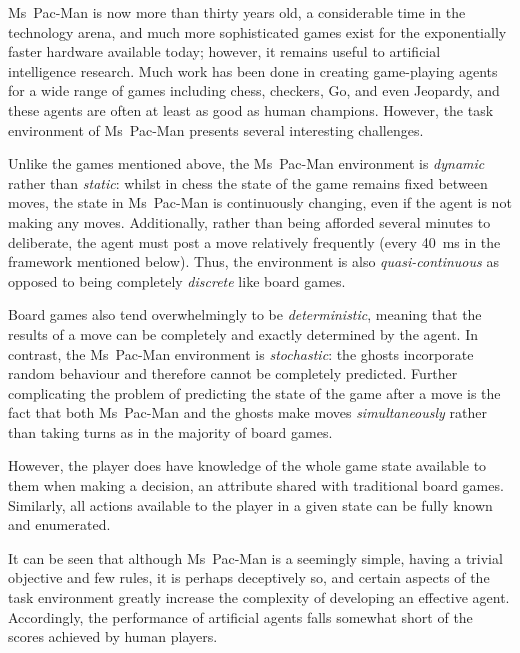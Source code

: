 Ms~Pac-Man is now more than thirty years old, a considerable time in the technology arena, and much more sophisticated games exist for the exponentially faster hardware available today; however, it remains useful to artificial intelligence research.  Much work has been done in creating game-playing agents for a wide range of games including chess, checkers, Go, and even Jeopardy, and these agents are often at least as good as human champions.  However, the task environment  of Ms~Pac-Man presents several interesting challenges.

Unlike the games mentioned above, the Ms~Pac-Man environment is \emph{dynamic} rather than \emph{static}: whilst in chess the state of the game remains fixed between moves, the state in Ms~Pac-Man is continuously changing, even if the agent is not making any moves.  Additionally, rather than being afforded several minutes to deliberate, the agent must post a move relatively frequently (every 40~ms in the framework mentioned below).  Thus, the environment is also \emph{quasi-continuous} as opposed to being completely \emph{discrete} like board games.

Board games also tend overwhelmingly to be \emph{deterministic}, meaning that the results of a move can be completely and exactly determined by the agent.  In contrast, the Ms~Pac-Man environment is \emph{stochastic}: the ghosts incorporate random behaviour and therefore cannot be completely predicted.  Further complicating the problem of predicting the state of the game after a move is the fact that both Ms~Pac-Man and the ghosts make moves \emph{simultaneously} rather than taking turns as in the majority of board games.

However, the player does have knowledge of the whole game state available to them when making a decision, an attribute shared with traditional board games.  Similarly, all actions available to the player in a given state can be fully known and enumerated.

It can be seen that although Ms~Pac-Man is a seemingly simple, having a trivial objective and few rules, it is perhaps deceptively so, and certain aspects of the task environment greatly increase the complexity of developing an effective agent.  Accordingly, the performance of artificial agents falls somewhat short of the scores achieved by human players.

